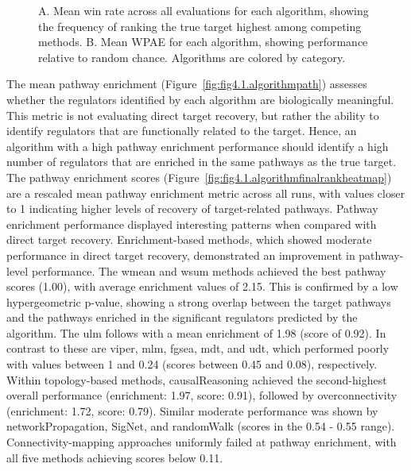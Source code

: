 
\begin{figure}[htbp]
  \centering
  \caption[Mean win rate and WPAE across all evaluations for each algorithm.]{A. Mean win rate across all evaluations for each algorithm, showing the frequency of ranking the true target highest among competing methods. B. Mean \gls{WPAE} for each algorithm, showing performance relative to random chance. Algorithms are colored by category.}
  \label{fig:fig4.3.WinandWPAE}
\end{figure}

The mean pathway enrichment (Figure~\ref{fig:fig4.1.algorithmpath}) assesses whether the regulators identified by each algorithm are biologically meaningful.
This metric is not evaluating direct target recovery, but rather the ability to identify regulators that are functionally related to the target.
Hence, an algorithm with a high pathway enrichment performance should identify a high number of regulators that are enriched in the same pathways as the true target.
The pathway enrichment scores (Figure~\ref{fig:fig4.1.algorithmfinalrankheatmap}) are a rescaled mean pathway enrichment metric across all runs, with values closer to 1 indicating higher levels of recovery of target-related pathways.
Pathway enrichment performance displayed interesting patterns when compared with direct target recovery.
Enrichment-based methods, which showed moderate performance in direct target recovery, demonstrated an improvement in pathway-level performance.
The wmean and wsum methods achieved the best pathway scores (1.00), with average enrichment values of 2.15. This is confirmed by a low hypergeometric p-value, showing a strong overlap between the target pathways and the pathways enriched in the significant regulators predicted by the algorithm.
The ulm follows with a mean enrichment of 1.98 (score of 0.92).
In contrast to these are viper, mlm, fgsea, mdt, and udt, which performed poorly with values between 1 and 0.24 (scores between 0.45 and 0.08), respectively.
Within topology-based methods, causalReasoning achieved the second-highest overall performance (enrichment: 1.97, score: 0.91), followed by overconnectivity (enrichment: 1.72, score: 0.79).
Similar moderate performance was shown by networkPropagation, SigNet, and randomWalk (scores in the 0.54 - 0.55 range).
Connectivity-mapping approaches uniformly failed at pathway enrichment, with all five methods achieving scores below 0.11.

